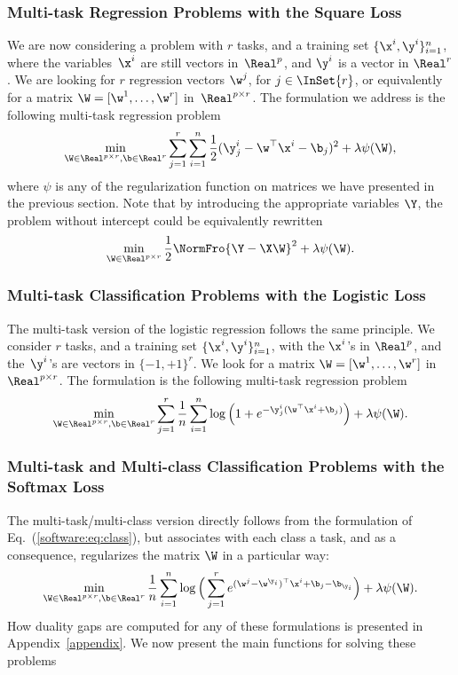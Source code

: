 \documentclass[a4paper, 11pt]{article}
\begin{document}
\subsubsection{Multi-task Regression Problems with the Square Loss}
We are now considering a problem with $r$ tasks, and a training set
$\{\x^i,\y^i\}_{i=1}^n$, where the variables~$\x^i$ are still vectors in~$\Real^p$, and $\y^i$
is a vector in $\Real^r$. We are looking for $r$ regression vectors $\w^j$, for $j\in \InSet{r}$, or equivalently for a matrix $\W=[\w^1,\ldots,\w^r]$ in~$\Real^{p \times r}$. The formulation we address is the following
multi-task regression problem
\begin{displaymath}
\min_{\W \in \Real^{p \times r}, \b \in \Real^r} \sum_{j=1}^r\sum_{i=1}^n \frac{1}{2}(\y^i_j-\w^\top\x^i-\b_j)^2 + \lambda\psi(\W),
\end{displaymath}
where $\psi$ is any of the regularization function on matrices we have presented in the previous section.
Note that by introducing the appropriate variables $\Y$, the problem without intercept could be equivalently rewritten
\begin{displaymath}
   \min_{\W \in \Real^{p \times r}} \frac{1}{2} \NormFro{\Y-\X\W}^2 + \lambda\psi(\W).
\end{displaymath}
\subsubsection{Multi-task Classification Problems with the Logistic Loss}
The multi-task version of the logistic regression follows the same principle.
We consider $r$ tasks, and a training set
$\{\x^i,\y^i\}_{i=1}^n$, with the $\x^i$'s in $\Real^p$, and the~$\y^i$'s
are vectors in $\{-1,+1\}^r$. We look for a matrix $\W=[\w^1,\ldots,\w^r]$ in $\Real^{p \times r}$. The formulation is the following
multi-task regression problem
\begin{displaymath}
\min_{\W \in \Real^{p \times r}, \b \in \Real^r} \sum_{j=1}^r\frac{1}{n}\sum_{i=1}^n \log\Big(1+e^{-\y^i_j(\w^\top\x^i+\b_j)}\Big) + \lambda\psi(\W).
\end{displaymath}
\subsubsection{Multi-task and Multi-class Classification Problems with the Softmax Loss}
The multi-task/multi-class version directly follows from the formulation of Eq.~(\ref{software:eq:class}), but associates with each class a task, and as a consequence, regularizes the matrix $\W$ in a particular way:
\begin{displaymath}
    \min_{\W \in \Real^{p \times r}, \b \in \Real^r} \frac{1}{n}\sum_{i=1}^n \log\Big(\sum_{j=1}^r e^{ (\w^j-\w^{\y_i})^\top\x^i + \b_j-\b_{\y_i}}\Big) + \lambda\psi(\W).
\end{displaymath}
How duality gaps are computed for any of these formulations is presented in Appendix~\ref{appendix}.
We now present the main functions for solving these problems
\end{document}
